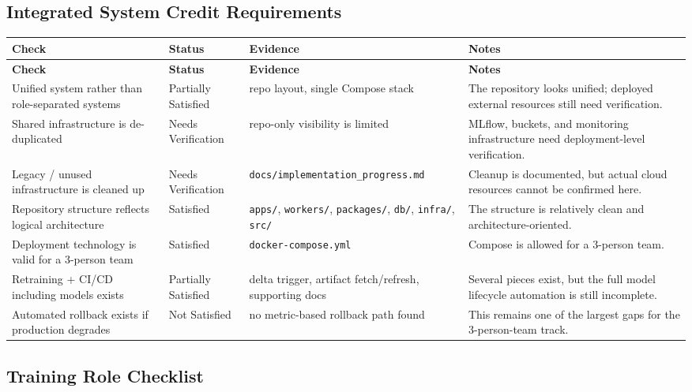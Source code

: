 \documentclass[11pt,a4paper]{article}
\begin{document}
\subsection{Integrated System Credit Requirements}

\begin{longtable}{P{4.2cm}P{2.4cm}P{3.8cm}P{4.8cm}}
\toprule
\textbf{Check} & \textbf{Status} & \textbf{Evidence} & \textbf{Notes} \\
\midrule
\endfirsthead
\toprule
\textbf{Check} & \textbf{Status} & \textbf{Evidence} & \textbf{Notes} \\
\midrule
\endhead
Unified system rather than role-separated systems & Partially Satisfied & repo layout, single Compose stack & The repository looks unified; deployed external resources still need verification. \\
Shared infrastructure is de-duplicated & Needs Verification & repo-only visibility is limited & MLflow, buckets, and monitoring infrastructure need deployment-level verification. \\
Legacy / unused infrastructure is cleaned up & Needs Verification & \texttt{docs/implementation\_progress.md} & Cleanup is documented, but actual cloud resources cannot be confirmed here. \\
Repository structure reflects logical architecture & Satisfied & \texttt{apps/}, \texttt{workers/}, \texttt{packages/}, \texttt{db/}, \texttt{infra/}, \texttt{src/} & The structure is relatively clean and architecture-oriented. \\
Deployment technology is valid for a 3-person team & Satisfied & \texttt{docker-compose.yml} & Compose is allowed for a 3-person team. \\
Retraining + CI/CD including models exists & Partially Satisfied & delta trigger, artifact fetch/refresh, supporting docs & Several pieces exist, but the full model lifecycle automation is still incomplete. \\
Automated rollback exists if production degrades & Not Satisfied & no metric-based rollback path found & This remains one of the largest gaps for the 3-person-team track. \\
\bottomrule
\end{longtable}

\subsection{Training Role Checklist}
\end{document}
